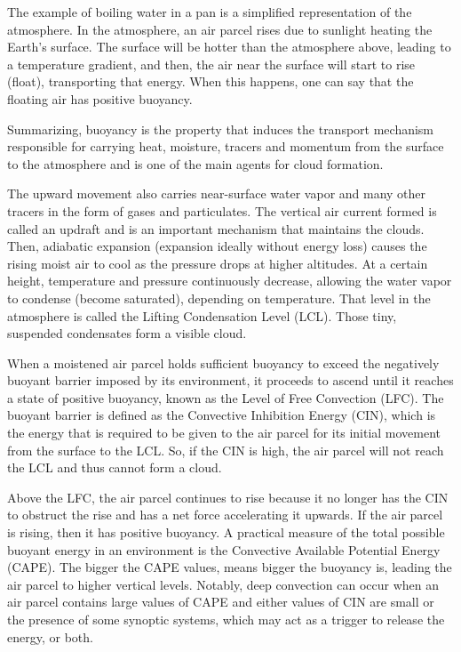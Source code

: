 The example of boiling water in a pan is a simplified representation of the atmosphere. In the atmosphere, an air parcel rises due to sunlight heating the Earth's surface. The surface will be hotter than the atmosphere above, leading to a temperature gradient, and then, the air near the surface will start to rise (float), transporting that energy. When this happens, one can say that the floating air has positive buoyancy. 

Summarizing, buoyancy is the property that induces the transport mechanism responsible for carrying heat, moisture, tracers and momentum from the surface to the atmosphere and is one of the main agents for cloud formation.

The upward movement also carries near-surface water vapor and many other tracers in the form of gases and particulates. The vertical air current formed is called an updraft and is an important mechanism that maintains the clouds. Then, adiabatic expansion (expansion ideally without energy loss) causes the rising moist air to cool as the pressure drops at higher altitudes. At a certain height, temperature and pressure continuously decrease, allowing the water vapor to condense (become saturated), depending on temperature. That level in the atmosphere is called the Lifting Condensation Level (LCL). Those tiny, suspended condensates form a visible cloud. 

When a moistened air parcel holds sufficient buoyancy to exceed the negatively buoyant barrier imposed by its environment, it proceeds to ascend until it reaches a state of positive buoyancy, known as the Level of Free Convection (LFC). The buoyant barrier is defined as the Convective Inhibition Energy (CIN), which is the energy that is required to be given to the air parcel for its initial movement from the surface to the LCL. So, if the CIN is high, the air parcel will not reach the LCL and thus cannot form a cloud. 

Above the LFC, the air parcel continues to rise because it no longer has the CIN to obstruct the rise and has a net force accelerating it upwards. If the air parcel is rising, then it has positive buoyancy. A practical measure of the total possible buoyant energy in an environment is the Convective Available Potential Energy (CAPE). The bigger the CAPE values, means bigger the buoyancy is, leading the air parcel to higher vertical levels. Notably, deep convection can occur when an air parcel contains large values of CAPE and either values of CIN are small or the presence of some synoptic systems, which may act as a trigger to release the energy, or both.

